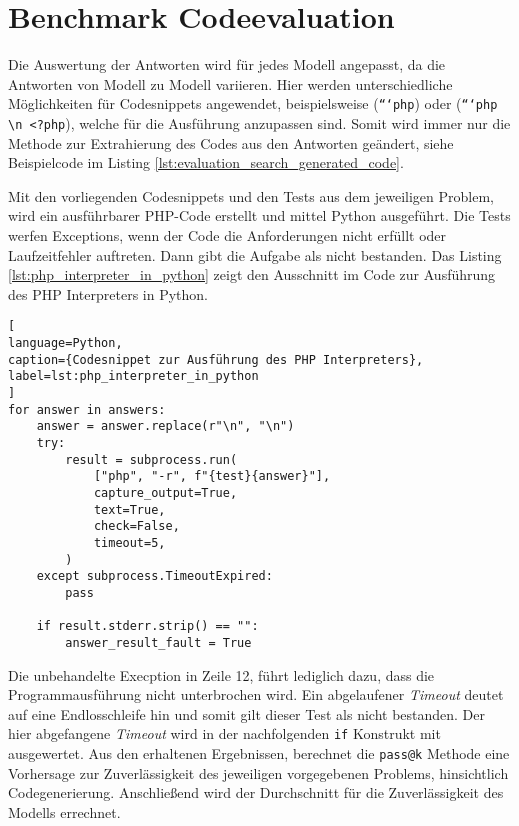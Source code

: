 

\section{Benchmark Codeevaluation}\label{sec:benchmark_evaluation}
Die Auswertung der Antworten wird für jedes Modell angepasst, da die Antworten von Modell zu Modell variieren. Hier werden unterschiedliche Möglichkeiten für Codesnippets angewendet, beispielsweise (\texttt{```php}) oder (\texttt{```php \textbackslash n <?php}), welche für die Ausführung anzupassen sind. Somit wird immer nur die Methode zur Extrahierung des Codes aus den Antworten geändert, siehe Beispielcode im Listing \ref{lst:evaluation_search_generated_code}.\vspace{0.2cm}

Mit den vorliegenden Codesnippets und den Tests aus dem jeweiligen Problem, wird ein ausführbarer PHP-Code erstellt und mittel Python ausgeführt. Die Tests werfen Exceptions, wenn der Code die Anforderungen nicht erfüllt oder Laufzeitfehler auftreten. Dann gibt die Aufgabe als nicht bestanden. Das Listing \ref{lst:php_interpreter_in_python} zeigt den Ausschnitt im Code zur Ausführung des PHP Interpreters in Python.

\begin{lstlisting}[
language=Python,
caption={Codesnippet zur Ausführung des PHP Interpreters},
label=lst:php_interpreter_in_python
]
for answer in answers:
    answer = answer.replace(r"\n", "\n")
    try:
        result = subprocess.run(
            ["php", "-r", f"{test}{answer}"],
            capture_output=True,
            text=True,
            check=False,
            timeout=5,
        )
    except subprocess.TimeoutExpired:
        pass

    if result.stderr.strip() == "":
        answer_result_fault = True
\end{lstlisting}

Die unbehandelte Execption in Zeile 12, führt lediglich dazu, dass die Programmausführung nicht unterbrochen wird. Ein abgelaufener \textit{Timeout} deutet auf eine Endlosschleife hin und somit gilt dieser Test als nicht bestanden. Der hier abgefangene \textit{Timeout} wird in der nachfolgenden \texttt{if} Konstrukt mit ausgewertet. Aus den erhaltenen Ergebnissen, berechnet die \texttt{pass@k} Methode eine Vorhersage zur Zuverlässigkeit des jeweiligen vorgegebenen Problems, hinsichtlich Codegenerierung. Anschließend wird der Durchschnitt für die Zuverlässigkeit des Modells errechnet.\vspace{0.2cm}

